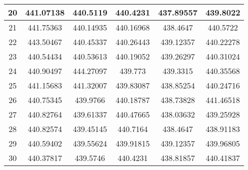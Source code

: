 \begin{table}
\begin{center}
\begin{tabular}{|c|c|c|c|c|c|}
20 & 441.07138 & 440.5119  & 440.4231  & 437.89557 & 439.8022  \\ \hline
21 & 441.75363 & 440.14935 & 440.16968 & 438.4647  & 440.5722  \\ \hline
22 & 443.50467 & 440.45337 & 440.26443 & 439.12357 & 440.22278 \\ \hline
23 & 440.54434 & 440.53613 & 440.19052 & 439.26297 & 440.31024 \\ \hline
24 & 440.90497 & 444.27097 & 439.773   & 439.3315  & 440.35568 \\ \hline
25 & 441.15683 & 441.32007 & 439.83087 & 438.85254 & 440.24716 \\ \hline
26 & 440.75345 & 439.9766  & 440.18787 & 438.73828 & 441.46518 \\ \hline
27 & 440.82764 & 439.61337 & 440.47665 & 438.03632 & 439.25928 \\ \hline
28 & 440.82574 & 439.45145 & 440.7164  & 438.4647  & 438.91183 \\ \hline
29 & 440.59402 & 439.55624 & 439.91815 & 439.12357 & 439.96805 \\ \hline
30 & 440.37817 & 439.5746  & 440.4231  & 438.81857 & 440.41837 \\ \hline
\end{tabular}
\label{table:przyklad}
\end{center}
\end{table}


